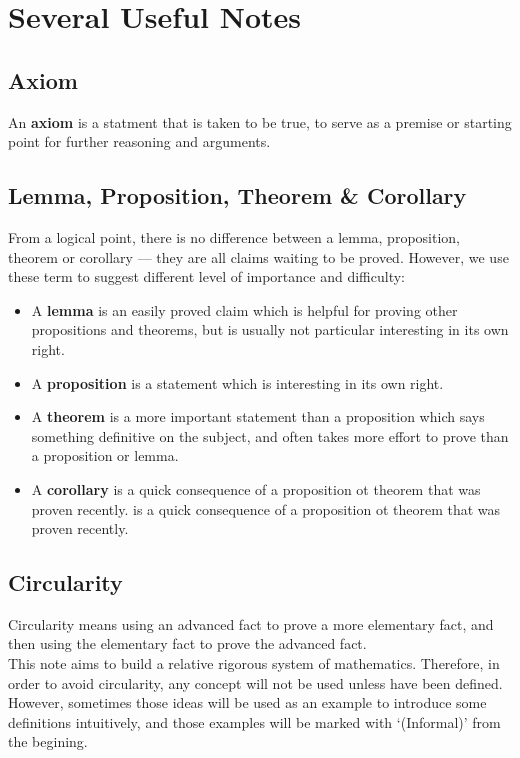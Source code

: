 \documentclass[a4paper]{book}
\theoremstyle{break}
\begin{document}
	\chapter{Several Useful Notes}
		\section*{Axiom}
			An \textbf{axiom} is a statment that is taken to be true, to serve as a premise or starting point for further reasoning and arguments.
		\section*{Lemma, Proposition, Theorem \& Corollary}
			From a logical point, there is no difference between a lemma, proposition, theorem or corollary --- they are all claims waiting to be proved. However, we use these term to suggest different level of importance and difficulty:
			\begin{itemize}
				\item A \textbf{lemma} is an easily proved claim which is helpful for proving other propositions and theorems, but is usually not particular interesting in its own right.
				\item A \textbf{proposition} is a statement which is interesting in its own right.
				\item A \textbf{theorem} is a more important statement than a proposition which says something definitive on the subject, and often takes more effort to prove than a proposition or lemma.
				\item A \textbf{corollary} is a quick consequence of a proposition ot theorem that was proven recently. is a quick consequence of a proposition ot theorem that was proven recently.
			\end{itemize}
		\section*{Circularity}
			Circularity means using an advanced fact to prove a more elementary fact, and then using the elementary fact to prove the advanced fact.\\
			This note aims to build a relative rigorous system of mathematics. Therefore, in order to avoid circularity, any concept will not be used unless have been defined. However, sometimes those ideas will be used as an example to introduce some definitions intuitively, and those examples will be marked with `(Informal)' from the begining.
\end{document}
